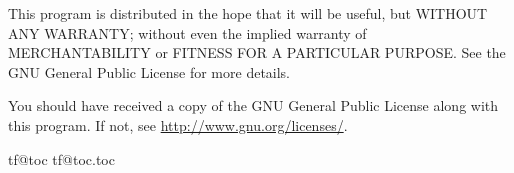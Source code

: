 This program is distributed in the hope that it will be useful,
but WITHOUT ANY WARRANTY; without even the implied warranty of
MERCHANTABILITY or FITNESS FOR A PARTICULAR PURPOSE.  See the
GNU General Public License for more details.

You should have received a copy of the GNU General Public License
along with this program.  If not, see \url{http://www.gnu.org/licenses/}.

\clearpage



\makeatletter
    \@cfttocstart
    \par
    \begingroup
      \parindent\z@ \parskip\cftparskip
      \@cftmaketoctitle
      \if@cfttocbibind
        \@cftdobibtoc
      \fi
  \begingroup
    \makeatletter
\def\contentsline#1#2#3#4{\csname l@#1\endcsname{#2}{#3}}%
    \if@filesw
      \expandafter\newwrite\csname tf@toc\endcsname
      \immediate\openout \csname tf@toc\endcsname \jobname.toc\relax
    \fi
    \@nobreakfalse
  \endgroup
    \endgroup
    \@cfttocfinish
\makeatother


\clearpage

\setlength{\parskip}{0pt}
\small\kaku
